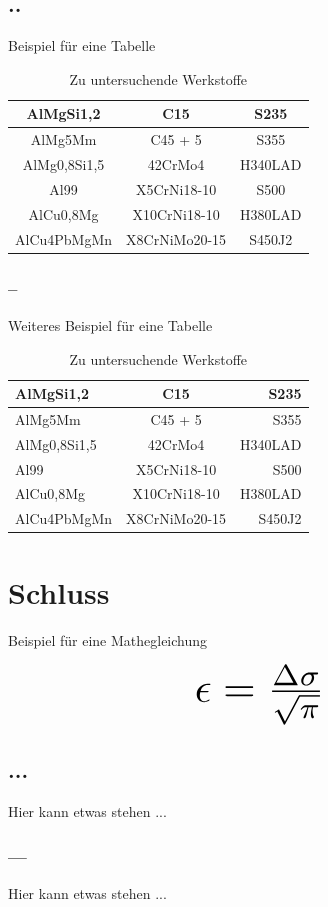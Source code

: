 \documentclass[a4paper, 12pt]{article}
\begin{document}
\subsection{..}
Beispiel für eine Tabelle

\bgroup
\def\arraystretch{1.5}
\begin{table}[!ht]
    \large
    \centering
    \begin{tabular}{|c|c|c|}
    \hline
    AlMgSi1,2 & C15 & S235 \\
    \hline 
    AlMg5Mm & C45 + 5 & S355 \\
    \hline
    AlMg0,8Si1,5 & 42CrMo4 & H340LAD \\
    \hline
    Al99 & X5CrNi18-10 & S500 \\
    \hline
    AlCu0,8Mg & X10CrNi18-10 & H380LAD \\
    \hline
    AlCu4PbMgMn & X8CrNiMo20-15 & S450J2\\
    \hline
    \end{tabular}
    \caption{Zu untersuchende Werkstoffe}
    \label{tab:tabelle1}
\end{table}
\egroup

\subsubsection{--}
Weiteres Beispiel für eine Tabelle

\bgroup
\def\arraystretch{1.5}
\begin{table}[!ht]
    \small
    \centering
    \begin{tabular}{l|c|r}
    AlMgSi1,2 & C15 & S235 \\
    \hline 
    AlMg5Mm & C45 + 5 & S355 \\
    \hline
    AlMg0,8Si1,5 & 42CrMo4 & H340LAD \\
    \hline
    Al99 & X5CrNi18-10 & S500 \\
    \hline
    AlCu0,8Mg & X10CrNi18-10 & H380LAD \\
    \hline
    AlCu4PbMgMn & X8CrNiMo20-15 & S450J2\\
    \end{tabular}
    \caption{Zu untersuchende Werkstoffe}
    \label{tab:tabelle2}
\end{table}
\egroup

\newpage
\section{Schluss}
Beispiel für eine Mathegleichung

\begin{displaymath}
\scalebox{3}{$\epsilon = \frac{\Delta\sigma}{\sqrt{\pi}}$}
\end{displaymath}

\subsection{...}
Hier kann etwas stehen ...

\subsubsection{---}
Hier kann etwas stehen ...



\end{document}
